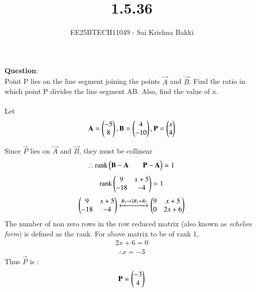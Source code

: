 \documentclass[journal]{IEEEtran}
\begin{document}

\vspace{3cm}

\title{1.5.36}
\author{EE25BTECH11049 - Sai Krishna Bakki}
 \maketitle
{\let\newpage\relax\maketitle}

\renewcommand{\thefigure}{\theenumi}
\renewcommand{\thetable}{\theenumi}
\setlength{\intextsep}{10pt} %


\renewcommand{\thetable}{\theenumi}

\textbf{Question}:\\
Point P lies on the line segment joining the points $\vec{A}$ and $\vec{B}$. Find the ratio in which point P divides the line segment AB. Also, find the value of x. \\ 
\solution \\
Let 
\begin{align}
\mathbf{A}= \begin{pmatrix}-5 \\ 8\end{pmatrix}, \mathbf{B}= \begin{pmatrix}4 \\ -10\end{pmatrix} , \mathbf{P} = \begin{pmatrix}x \\ 4\end{pmatrix}
\end{align}    

Since $\vec{P}$ lies on $\vec{A}$ and $\vec{B}$, they must be collinear
\begin{align}
\therefore \text{rank}\begin{pmatrix}\mathbf{B} - \mathbf{A} & &\mathbf{P} - \mathbf{A}\end{pmatrix} = 1
\end{align}
\begin{align}
    \text{rank}\begin{pmatrix}9 & x+5 \\ -18 & -4\end{pmatrix} = 1
\end{align}
\begin{align}
	\begin{pmatrix}9 &  x+5\\ -18 & -4\end{pmatrix} \xleftrightarrow[]{R_2 \rightarrow {2R_1 + R_2}} \begin{pmatrix}9 & x+5 \\ 0 & 2x+6\end{pmatrix}  
\end{align}
The number of non zero rows in the row reduced matrix (also known as {\em echelon form}) is defined as the rank. For above matrix to be of rank 1,
\begin{align}
    2x+6 = 0
\end{align}
\begin{align}
\therefore x = -3
\end{align}
Thus $\vec{P}$ is :
\begin{align}
    \mathbf{P} = \begin{pmatrix}-3 \\ 4\end{pmatrix}
\end{align}
\end{document}
